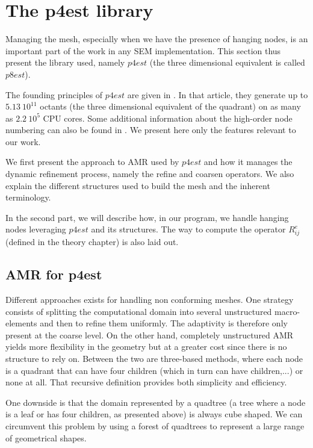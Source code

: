 \section{The p4est library}

Managing the mesh, especially when we have the presence of hanging nodes, is an important part of the work in any SEM implementation. This section thus present the library used, namely $p4est$ (the three dimensional equivalent is called $p8est$). 

The founding principles of $p4est$ are given in \cite{p4est}. In that article, they generate up to $5.13\: 10^{11}$ octants (the three dimensional equivalent of the quadrant) on as many as $2.2 \: 10^{5}$ CPU cores. Some additional information about the high-order node numbering can also be found in \cite{p4est2}. We present here only the features relevant to our work. 

We first present the approach to AMR used by $p4est$ and how it manages the dynamic refinement process, namely the refine and coarsen operators. We also explain the different structures used to build the mesh and the inherent terminology. 

In the second part, we will describe how, in our program, we handle hanging nodes leveraging $p4est$ and its structures. The way to compute the operator $R_{ij}^e$ (defined in the theory chapter) is also laid out. 

\subsection{AMR for p4est}

Different approaches exists for handling non conforming meshes. One strategy consists of splitting the computational domain into several unstructured macro-elements and then to refine them uniformly. The adaptivity is therefore only present at the coarse level. On the other hand, completely unstructured AMR yields more flexibility in the geometry but at a greater cost since there is no structure to rely on. Between the two are three-based methods, where each node is a quadrant that can have four children (which in turn can have children,...) or none at all. That recursive definition provides both simplicity and efficiency.

One downside is that the domain represented by a quadtree (a tree where a node is a leaf or has four children, as presented above) is always cube shaped. We can circumvent this problem by using a forest of quadtrees to represent a large range of geometrical shapes. 

